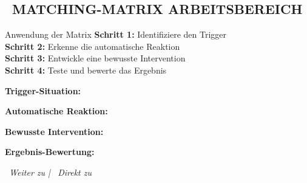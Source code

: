 \subsection*{\textcolor{ctmmOrange}{\faTable~MATCHING-MATRIX ARBEITSBEREICH}}

\begin{ctmmPurpleBox}{Anwendung der Matrix}
\textbf{Schritt 1:} Identifiziere den Trigger\\
\textbf{Schritt 2:} Erkenne die automatische Reaktion\\
\textbf{Schritt 3:} Entwickle eine bewusste Intervention\\
\textbf{Schritt 4:} Teste und bewerte das Ergebnis
\end{ctmmPurpleBox}

\vspace{0.5cm}
\textbf{Trigger-Situation:}\\

\vspace{0.5cm}
\textbf{Automatische Reaktion:}\\

\vspace{0.5cm}
\textbf{Bewusste Intervention:}\\

\vspace{0.5cm}
\textbf{Ergebnis-Bewertung:}\\

\vspace{1cm}
\begin{center}
\textit{\textcolor{ctmmGreen}{\faChevronRight~Weiter zu}  | \textcolor{ctmmBlue}{\faBookmark~Direkt zu} }
\end{center}
